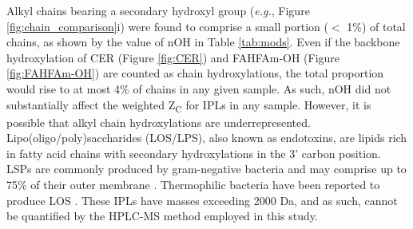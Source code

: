 

Alkyl chains bearing a secondary hydroxyl group (\textit{e.g.}, Figure \ref{fig:chain_comparison}i) were found to comprise a small portion ($<$ 1\%) of total chains, as shown by the value of nOH in Table \ref{tab:mods}. Even if the backbone hydroxylation of CER (Figure \ref{fig:CER}) and FAHFAm-OH (Figure \ref{fig:FAHFAm-OH}) are counted as chain hydroxylations, the total proportion would rise to at most 4\% of chains in any given sample. As such, nOH did not substantially affect the weighted Z\textsubscript{C} for IPLs in any sample. However, it is possible that alkyl chain hydroxylations are underrepresented. Lipo(oligo/poly)saccharides (LOS/LPS), also known as endotoxins, are lipids rich in fatty acid chains with secondary hydroxylations in the 3' carbon position. LSPs are commonly produced by gram-negative bacteria and may comprise up to 75\% of their outer membrane \citep{silipo2010lipopolysaccharides}. Thermophilic bacteria have been reported to produce LOS \citep{di2014thermophiles}. These IPLs have masses exceeding 2000 Da, and as such, cannot be quantified by the HPLC-MS method employed in this study.


